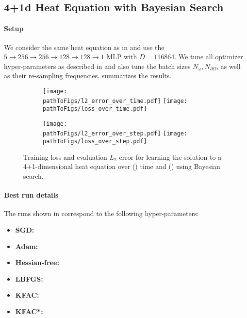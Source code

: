 \subsection{4+1d Heat Equation with Bayesian Search}\label{sec:4d-heat-bayes-app}

\paragraph{Setup} We consider the same heat equation as in  and use the $5 \to 256 \to 256\to 128 \to 128 \to 1$ MLP with $D=\num{116864}$.
We tune all optimizer hyper-parameters as described in  and also tune the batch sizes $N_{\omega}, N_{\partial \Omega}$, as well as their re-sampling frequencies.
 summarizes the results.

\begin{figure}[!h]
  \centering
  \def\pathToFigs{../kfac_pinns_exp/exp31_heat4d_mlp_tanh_256_bayes}
  \begin{subfigure}[t]{1.0\linewidth}
    \caption{}\label{subfig:heat4d-bayes-time}
    \texttt{[image: \\pathToFigs/l2\_error\_over\_time.pdf]}
    \texttt{[image: \\pathToFigs/loss\_over\_time.pdf]}
  \end{subfigure}
  \begin{subfigure}[t]{1.0\linewidth}
    \caption{}\label{subfig:heat4d-bayes-step}
    \texttt{[image: \\pathToFigs/l2\_error\_over\_step.pdf]}
    \texttt{[image: \\pathToFigs/loss\_over\_step.pdf]}
  \end{subfigure}
  \caption{Training loss and evaluation $L_2$ error for learning the solution to a 4+1-dimensional heat equation over () time and () using Bayesian search.}\label{fig:heat4d-bayes-appendix}
\end{figure}

\paragraph{Best run details}
The runs shown in  correspond to the following hyper-parameters:
\begin{itemize}
  \def\pathToRuns{../kfac_pinns_exp/exp31_heat4d_mlp_tanh_256_bayes/tex/}
\item \textbf{SGD:} 
\item \textbf{Adam:} 
\item \textbf{Hessian-free:} 
\item \textbf{LBFGS:} 
\item \textbf{KFAC:} 
\item \textbf{KFAC*:} 
\end{itemize}

